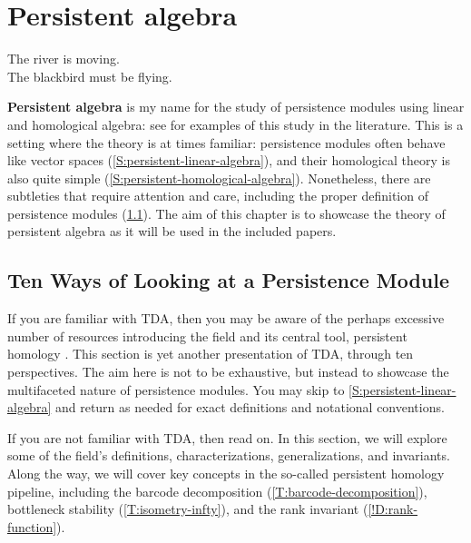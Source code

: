 
\chapter{Persistent algebra}
\label{C:persistent-algebra}

\begin{epigraph}
  The river is moving. \\
  The blackbird must be flying.
\end{epigraph}

\textbf{Persistent algebra} is my name for the study of persistence modules using linear and homological algebra: see \cite{BubenikMilicevic2021,BSS2023,JNT2023,Miller2025,TorrasCasas2023} for examples of this study in the literature. This is a setting where the theory is at times familiar: persistence modules often behave like vector spaces (\cref{S:persistent-linear-algebra}), and their homological theory is also quite simple (\cref{S:persistent-homological-algebra}). Nonetheless, there are subtleties that require attention and care, including the proper definition of persistence modules (\cref{S:ways-of-looking}). The aim of this chapter is to showcase the theory of persistent algebra as it will be used in the included papers.

\section{Ten Ways of Looking at a Persistence Module}
\label{S:ways-of-looking}

If you are familiar with TDA, then you may be aware of the perhaps excessive number of resources introducing the field and its central tool, persistent homology \cite[][and the ``Preliminaries'' section of many papers]{CdSGO2016,DeyWang2022,EdelsbrunnerMorozov2013,OPTGH2017,Oudot2015}. This section is yet another presentation of TDA, through ten perspectives. The aim here is not to be exhaustive, but instead to showcase the multifaceted nature of persistence modules.
You may skip to \cref{S:persistent-linear-algebra} and return as needed for exact definitions and notational conventions.

If you are not familiar with TDA, then read on. In this section, we will explore some of the field's definitions, characterizations, generalizations, and invariants. Along the way, we will cover key concepts in the so-called persistent homology pipeline, including the barcode decomposition (\cref{T:barcode-decomposition}), bottleneck stability (\cref{T:isometry-infty}), and the rank invariant (\cref{!D:rank-function}).

